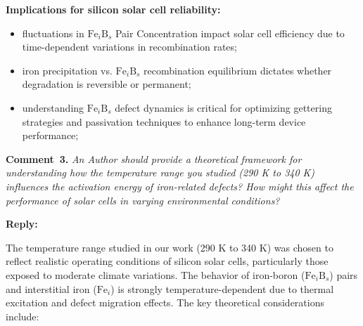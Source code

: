 \documentclass[a4paper,fleqn]{cas-sc}
\begin{document}
\textbf{Implications for silicon solar cell reliability:}

\begin{itemize}
    \item fluctuations in $\mathrm{Fe}_i\mathrm{B}_s$ Pair Concentration impact solar cell efficiency due to time-dependent variations in recombination rates;
    \item iron precipitation vs. $\mathrm{Fe}_i\mathrm{B}_s$ recombination equilibrium  dictates whether degradation is reversible or permanent;
    \item understanding $\mathrm{Fe}_i\mathrm{B}_s$ defect dynamics is critical for optimizing gettering strategies and passivation techniques to enhance long-term device performance;
\end{itemize}


\vspace{1cm}
\noindent
\textcolor[rgb]{0.00,0.50,1.00}{\textbf{Comment~3.}}
\emph{An Author should provide a theoretical framework for understanding how the temperature range you studied (290 K to 340 K) influences the activation energy of iron-related defects? How might this affect the performance of solar cells in varying environmental conditions?}

\noindent
\textcolor[rgb]{0.51,0.00,0.00}{\textbf{Reply:}}

The temperature range studied in our work (290 K to 340 K) was chosen to reflect realistic operating conditions of silicon solar cells, particularly those exposed to moderate climate variations. The behavior of iron-boron ($\mathrm{Fe}_i\mathrm{B}_s$) pairs and interstitial iron ($\mathrm{Fe}_i$) is strongly temperature-dependent due to thermal excitation and defect migration effects. The key theoretical considerations include:
\end{document}

